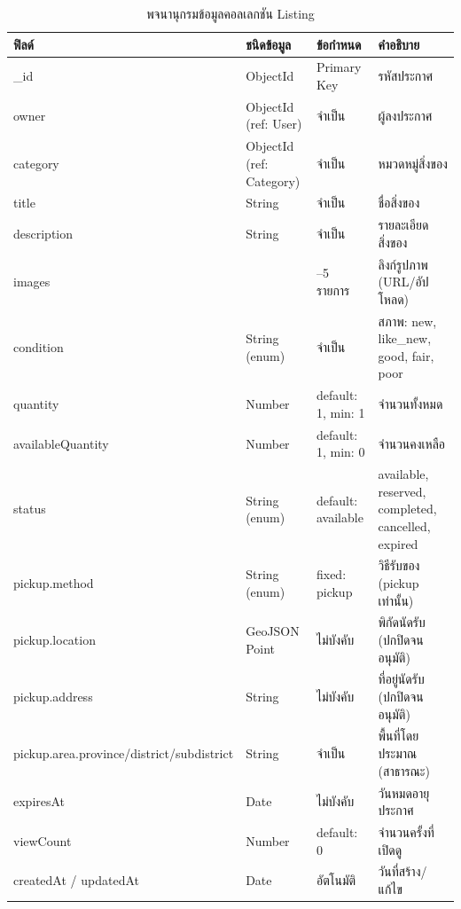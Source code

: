 \documentclass[12pt,a4paper]{report}
\begin{document}
\begin{table}[htbp]
\centering
\caption{พจนานุกรมข้อมูลคอลเลกชัน Listing}
\label{tab:dd-listing}
\begin{tabularx}{\textwidth}{>{\raggedright\arraybackslash}p{3.3cm} >{\raggedright\arraybackslash}p{2.5cm} >{\raggedright\arraybackslash}p{2.3cm} X}
\toprule
\textbf{ฟิลด์} & \textbf{ชนิดข้อมูล} & \textbf{ข้อกำหนด} & \textbf{คำอธิบาย}\\
\midrule
\_id & ObjectId & Primary Key & รหัสประกาศ\\
owner & ObjectId (ref: User) & จำเป็น & ผู้ลงประกาศ\\
category & ObjectId (ref: Category) & จำเป็น & หมวดหมู่สิ่งของ\\
title & String & จำเป็น & ชื่อสิ่งของ\\
description & String & จำเป็น & รายละเอียดสิ่งของ\\
images & [String] & 1--5 รายการ & ลิงก์รูปภาพ (URL/อัปโหลด)\\
condition & String (enum) & จำเป็น & สภาพ: new, like\_new, good, fair, poor\\
quantity & Number & default: 1, min: 1 & จำนวนทั้งหมด\\
availableQuantity & Number & default: 1, min: 0 & จำนวนคงเหลือ\\
status & String (enum) & default: available & available, reserved, completed, cancelled, expired\\
pickup.method & String (enum) & fixed: pickup & วิธีรับของ (pickup เท่านั้น)\\
pickup.location & GeoJSON Point & ไม่บังคับ & พิกัดนัดรับ (ปกปิดจนอนุมัติ)\\
pickup.address & String & ไม่บังคับ & ที่อยู่นัดรับ (ปกปิดจนอนุมัติ)\\
pickup.area.\allowbreak province/\allowbreak district/\allowbreak subdistrict & String & จำเป็น & พื้นที่โดยประมาณ (สาธารณะ)\\
expiresAt & Date & ไม่บังคับ & วันหมดอายุประกาศ\\
viewCount & Number & default: 0 & จำนวนครั้งที่เปิดดู\\
createdAt / updatedAt & Date & อัตโนมัติ & วันที่สร้าง/แก้ไข\\
\bottomrule
\end{tabularx}
\end{table}
\end{document}

